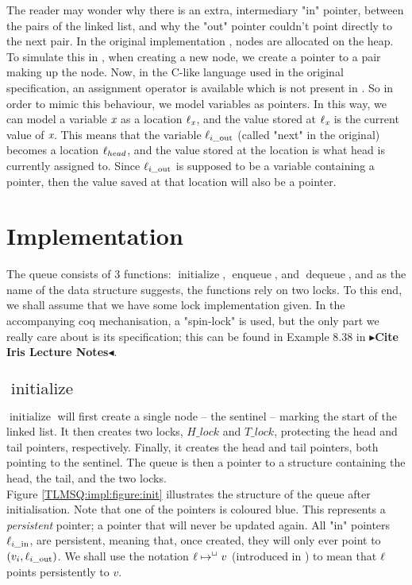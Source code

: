 \documentclass[a4paper, 11pt]{report}
\newcommand{\initialise}{\operatorname{initialize}}
\newcommand{\enqueue}{\operatorname{enqueue}}
\newcommand{\dequeue}{\operatorname{dequeue}}
\newcommand{\locin}[1]{\loc_{#1\_\text{in}}}
\newcommand{\locout}[1]{\loc_{#1\_\text{out}}}
\newcommand{\todo}[1]{{\color[rgb]{.5,0,0}\textbf{$\blacktriangleright$#1$\blacktriangleleft$}}}
\begin{document}
The reader may wonder why there is an extra, intermediary "in" pointer, between the pairs of the linked list, and why the "out" pointer couldn't point directly to the next pair. In the original implementation \cite{DBLP:conf/podc/MichaelS96}, nodes are allocated on the heap. To simulate this in \heaplang, when creating a new node, we create a pointer to a pair making up the node. Now, in the C-like language used in the original specification, an assignment operator is available which is not present in \heaplang. So in order to mimic this behaviour, we model variables as pointers. In this way, we can model a variable $\textit{x}$ as a location $\ell_{\textit{x}}$, and the value stored at $\ell_{\textit{x}}$ is the current value of $\textit{x}$. This means that the variable $\locout{i}$ (called "next" in the original) becomes a location $\ell_{head}$, and the value stored at the location is what head is currently assigned to. Since $\locout{i}$ is supposed to be a variable containing a pointer, then the value saved at that location will also be a pointer.


\section{Implementation}
\label{TLMSQ:section:implementation}

The queue consists of 3 functions: $\initialise$, $\enqueue$, and $\dequeue$, and as the name of the data structure suggests, the functions rely on two locks. To this end, we shall assume that we have some lock implementation given. In the accompanying coq mechanisation, a "spin-lock" is used, but the only part we really care about is its specification; this can be found in Example 8.38 in \todo{Cite Iris Lecture Notes}.

\subsection[initialise]{$\initialise$}

$\initialise$ will first create a single node -- the sentinel -- marking the start of the linked list. It then creates two locks, $H\_lock$ and $T\_lock$, protecting the head and tail pointers, respectively. Finally, it creates the head and tail pointers, both pointing to the sentinel. The queue is then a pointer to a structure containing the head, the tail, and the two locks.\\
Figure \ref{TLMSQ:impl:figure:init} illustrates the structure of the queue after initialisation. Note that one of the pointers is coloured blue. This represents a \emph{persistent} pointer; a pointer that will never be updated again. All "in" pointers $\locin{i}$, are persistent, meaning that, once created, they will only ever point to $(v_i, \locout{i})$. We shall use the notation $\ell \mapsto^{\mathop{\Box}} v$ (introduced in \cite{DBLP:conf/cpp/VindumB21}) to mean that $\ell$ points persistently to $v$.
\end{document}
